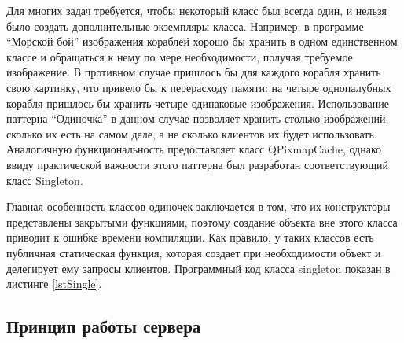 \documentclass[12pt, a4paper, oneside]{article}
\begin{document}
Для многих задач требуется, чтобы некоторый класс был всегда один, и нельзя было создать дополнительные экземпляры класса. Например, в программе ``Морской бой'' изображения кораблей хорошо бы хранить в одном единственном классе и обращаться к нему по мере необходимости, получая требуемое изображение. В противном случае пришлось бы для каждого корабля хранить свою картинку, что привело бы к перерасходу памяти: на четыре однопалубных корабля пришлось бы хранить четыре одинаковые изображения. Использование паттерна ``Одиночка'' в данном случае позволяет хранить столько изображений, сколько их есть на самом деле, а не сколько клиентов их будет использовать. Аналогичную функциональность предоставляет класс QPixmapCache, однако ввиду практической важности этого паттерна был разработан соответствующий класс Singleton. 

Главная особенность классов-одиночек заключается в том, что их конструкторы представлены закрытыми функциями, поэтому создание объекта вне этого класса приводит к ошибке времени компиляции. Как правило, у таких классов есть публичная статическая функция, которая создает при необходимости объект и делегирует ему запросы клиентов. Программный код класса singleton показан в листинге \ref{lstSingle}.

\begin{figure}[t!]

\end{figure}

\subsection{Принцип работы сервера}
\end{document}
